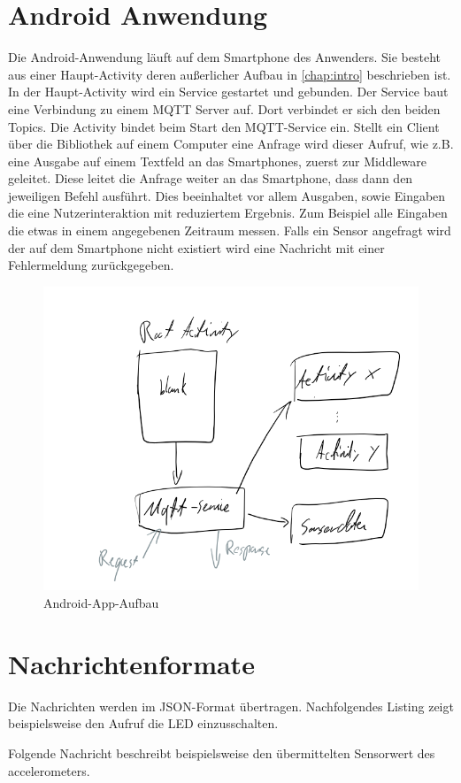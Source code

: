 \documentclass[11pt,a4paper]{report}
\begin{document}
\section*{Android Anwendung}
Die Android-Anwendung läuft auf dem Smartphone des Anwenders.
Sie besteht aus einer Haupt-Activity deren außerlicher Aufbau in \ref{chap:intro} beschrieben ist. 
\\
In der Haupt-Activity wird ein Service gestartet und gebunden.
Der Service baut eine Verbindung zu einem MQTT Server auf.
Dort verbindet er sich den beiden Topics. 
Die Activity bindet beim Start den MQTT-Service ein.
Stellt ein Client über die Bibliothek auf einem Computer eine Anfrage wird dieser Aufruf, wie z.B. eine Ausgabe auf einem Textfeld an das Smartphones,  zuerst zur Middleware geleitet.
Diese leitet die Anfrage weiter an das Smartphone, dass dann den jeweiligen Befehl ausführt.
Dies beeinhaltet vor allem Ausgaben, sowie Eingaben die eine Nutzerinteraktion mit reduziertem Ergebnis.
Zum Beispiel alle Eingaben die etwas in einem angegebenen Zeitraum messen.
Falls ein Sensor angefragt wird der auf dem Smartphone nicht existiert wird eine Nachricht mit einer Fehlermeldung zurückgegeben.
\begin{figure}[htbp]
  \centering
  \includegraphics[width=.9\textwidth]{images/android_app.png}
  \caption{Android-App-Aufbau}
  \label{fig:android_app}
\end{figure}


\section*{Nachrichtenformate}
Die Nachrichten werden im JSON-Format übertragen.
Nachfolgendes Listing zeigt beispielsweise den Aufruf die LED einzusschalten.

Folgende Nachricht beschreibt beispielsweise den übermittelten Sensorwert des accelerometers.

\end{document}
